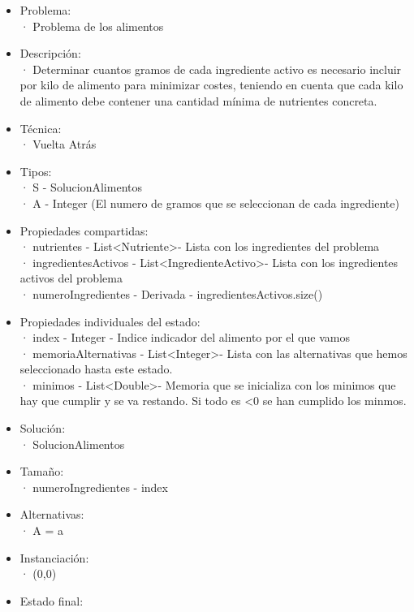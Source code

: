 \documentclass[a4paper,12pt]{article}
\begin{document}
\begin{itemize}

\item Problema: \\
      · Problema de los alimentos
\item Descripción: \\
· Determinar cuantos gramos de cada ingrediente activo es necesario incluir por kilo
de alimento para minimizar costes, teniendo en cuenta que cada kilo de alimento debe
contener una cantidad mínima de nutrientes concreta.
\item Técnica:\\
      · Vuelta Atrás
\item Tipos:\\
      · S - SolucionAlimentos\\
      · A - Integer \in [0,1000] (El numero de gramos que se seleccionan de cada ingrediente)
\item Propiedades compartidas:\\
      · nutrientes - List\textless Nutriente\textgreater - Lista con los ingredientes del problema\\
      · ingredientesActivos - List\textless IngredienteActivo\textgreater - Lista con los ingredientes activos del problema\\
      · numeroIngredientes - Derivada - ingredientesActivos.size()
\item Propiedades individuales del estado:\\
      · index - Integer - Indice indicador del alimento por el que vamos\\
      · memoriaAlternativas - List\textless Integer\textgreater - Lista con las alternativas que hemos seleccionado hasta este estado.\\
      · minimos - List\textless Double\textgreater - Memoria que se inicializa con los minimos que hay que cumplir y se va restando. Si todo es <0 se han cumplido los minmos.
\item Solución:\\
      · SolucionAlimentos
\item Tamaño:\\
      · numeroIngredientes - index
\item Alternativas:\\
      · A = {a \in [1,1000]}
\item Instanciación:\\
      · (0,0)
\item Estado final:\\

\end{itemize}
\end{document}
